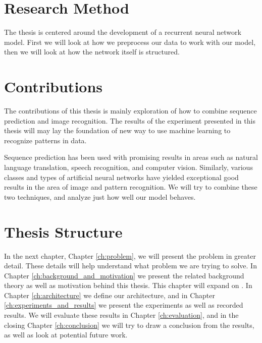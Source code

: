 
\section{Research Method}
The thesis is centered around the development of a recurrent neural network model. First we will look at how we preprocess our data to work with our model, then we will look at how the network itself is structured.


\section{Contributions}
The contributions of this thesis is mainly exploration of how to combine sequence prediction and image recognition. The results of the experiment presented in this thesis will may lay the foundation of new way to use machine learning to recognize patterns in data.

Sequence prediction has been used with promising results in areas such as natural language translation, speech recognition, and computer vision. Similarly, various classes and types of artificial neural networks have yielded exceptional good results in the area of image and pattern recognition. We will try to combine these two techniques, and analyze just how well our model behaves.



\section{Thesis Structure}
In the next chapter, Chapter \ref{ch:problem}, we will present the problem in greater detail. These details will help understand what problem we are trying to solve. In Chapter \ref{ch:background_and_motivation} we present the related background theory as well as motivation behind this thesis. This chapter will expand on . In Chapter \ref{ch:architecture} we define our architecture, and in Chapter \ref{ch:experiments_and_results} we present the experiments as well as recorded results. We will evaluate these results in Chapter \ref{ch:evaluation}, and in the closing Chapter \ref{ch:conclusion} we will try to draw a conclusion from the results, as well as look at potential future work.